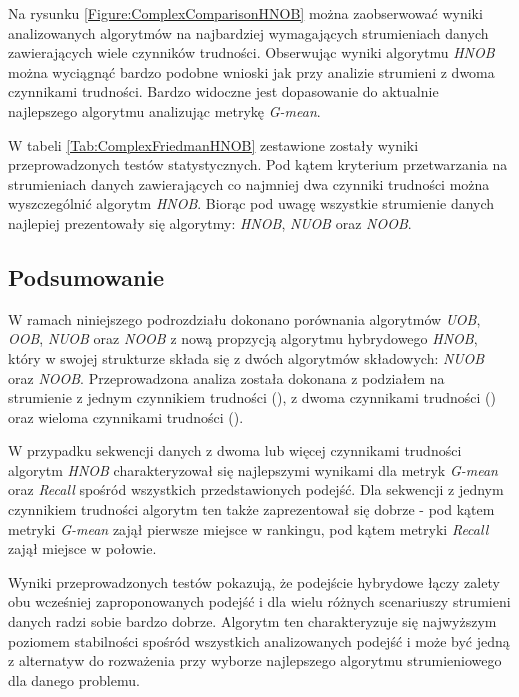 \noindent Na rysunku \ref{Figure:ComplexComparisonHNOB} można zaobserwować wyniki analizowanych algorytmów na najbardziej wymagających strumieniach danych zawierających wiele czynników trudności. Obserwując wyniki algorytmu \textit{HNOB} można wyciągnąć bardzo podobne wnioski jak przy analizie strumieni z dwoma czynnikami trudności. Bardzo widoczne jest dopasowanie do aktualnie najlepszego algorytmu analizując metrykę \textit{G-mean}.

W tabeli \ref{Tab:ComplexFriedmanHNOB} zestawione zostały wyniki przeprowadzonych testów statystycznych. Pod kątem kryterium przetwarzania na strumieniach danych zawierających co najmniej dwa czynniki trudności można wyszczególnić algorytm \textit{HNOB}. Biorąc pod uwagę wszystkie strumienie danych najlepiej prezentowały się algorytmy: \textit{HNOB}, \textit{NUOB} oraz \textit{NOOB}.

\subsection{Podsumowanie}

\noindent W ramach niniejszego podrozdziału dokonano porównania algorytmów \textit{UOB}, \textit{OOB}, \textit{NUOB} oraz \textit{NOOB} z nową propzycją algorytmu hybrydowego \textit{HNOB}, który w swojej strukturze składa się z dwóch algorytmów składowych: \textit{NUOB} oraz \textit{NOOB}. Przeprowadzona analiza została dokonana z podziałem na strumienie z jednym czynnikiem trudności (), z dwoma czynnikami trudności () oraz wieloma czynnikami trudności ().

W przypadku sekwencji danych z dwoma lub więcej czynnikami trudności algorytm \textit{HNOB} charakteryzował się najlepszymi wynikami dla metryk \textit{G-mean} oraz \textit{Recall} spośród wszystkich przedstawionych podejść. Dla sekwencji z jednym czynnikiem trudności algorytm ten także zaprezentował się dobrze - pod kątem metryki \textit{G-mean} zajął pierwsze miejsce w rankingu, pod kątem metryki \textit{Recall} zajął miejsce w połowie.

Wyniki przeprowadzonych testów pokazują, że podejście hybrydowe łączy zalety obu wcześniej zaproponowanych podejść i dla wielu różnych scenariuszy strumieni danych radzi sobie bardzo dobrze. Algorytm ten charakteryzuje się najwyższym poziomem stabilności spośród wszystkich analizowanych podejść i może być jedną z alternatyw do rozważenia przy wyborze najlepszego algorytmu strumieniowego dla danego problemu.